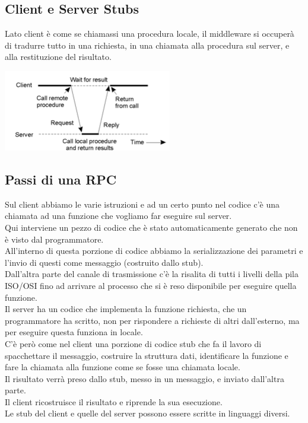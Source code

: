 \subsection{Client e Server Stubs}
Lato client è come se chiamassi una procedura locale, il middleware si occuperà di tradurre tutto in una richiesta, in una chiamata alla procedura sul server, e alla restituzione del risultato. 
\begin{center}
    \includegraphics[width = .5\textwidth]{images/lezione3/clientserverstub.png}
\end{center}

\subsection{Passi di una RPC}
Sul client abbiamo le varie istruzioni e ad un certo punto nel codice c'è una chiamata ad una funzione che vogliamo far eseguire sul server. \\
Qui interviene un pezzo di codice che è stato automaticamente generato che non è visto dal programmatore. \\
All'interno di questa porzione di codice abbiamo la serializzazione dei parametri e l'invio di questi come messaggio (costruito dallo stub).\\
Dall'altra parte del canale di trasmissione c'è la risalita di tutti i livelli della pila ISO/OSI fino ad arrivare al processo che si è reso disponibile per eseguire quella funzione. \\
Il server ha un codice che implementa la funzione richiesta, che un programmatore ha scritto, non per rispondere a richieste di altri dall'esterno, ma per eseguire questa funziona in locale.\\
C'è però come nel client una porzione di codice stub che fa il lavoro di spacchettare il messaggio, costruire la struttura dati, identificare la funzione e fare la chiamata alla funzione come se fosse una chiamata locale.\\
Il risultato verrà preso dallo stub, messo in un messaggio, e inviato dall'altra parte.\\
Il client ricostruisce il risultato e riprende la sua esecuzione.\\
Le stub del client e quelle del server possono essere scritte in linguaggi diversi.

